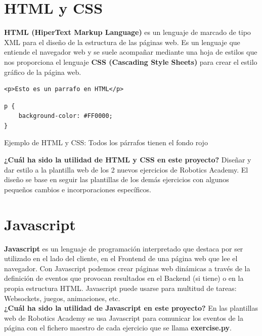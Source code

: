 \section{HTML y CSS}
\label{sec:html_css}

\textbf{HTML (HiperText Markup Language)} es un lenguaje de marcado de tipo XML para el diseño de la estructura de las páginas web. Es un lenguaje que entiende el navegador web y se suele acompañar mediante una hoja de estilos que nos proporciona el lenguaje \textbf{CSS (Cascading Style Sheets)} para crear el estilo gráfico de la página web.\\


\begin{code}[H]
\begin{lstlisting}
<p>Esto es un parrafo en HTML</p>
\end{lstlisting}
\begin{lstlisting}
p {
	background-color: #FF0000;
}
\end{lstlisting}
\caption[Ejemplo de HTML y CSS]{Ejemplo de HTML y CSS: Todos los párrafos tienen el fondo rojo}
\label{cod:codigo_urdf}
\end{code}

\textbf{¿Cuál ha sido la utilidad de HTML y CSS en este proyecto?} Diseñar y dar estilo a la plantilla web de los 2 nuevos ejercicios de Robotics Academy. El diseño se base en seguir las plantillas de los demás ejercicios con algunos pequeños cambios e incorporaciones específicos.\\




\section{Javascript}
\label{sec:javascript}

\textbf{Javascript} es un lenguaje de programación interpretado que destaca por ser utilizado en el lado del cliente, en el Frontend de una página web que lee el navegador. Con Javascript podemos crear páginas web dinámicas a través de la definición de eventos que provocan resultados en el Backend (si tiene) o en la propia estructura HTML. Javascript puede usarse para multitud de tareas: Websockets, juegos, animaciones, etc.\\

\textbf{¿Cuál ha sido la utilidad de Javascript en este proyecto?}
En las plantillas web de Robotics Academy se usa Javascript para comunicar los eventos de la página con el fichero maestro de cada ejercicio que se llama \textbf{exercise.py}.\\




